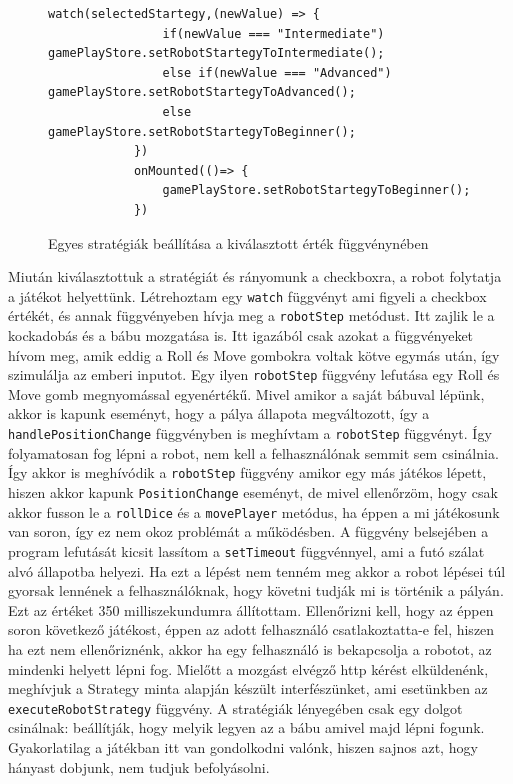 \documentclass[a4paper,twoside]{article}
\begin{document}
\begin{figure}
	\caption{Egyes stratégiák beállítása a kiválasztott érték függvénynében}
	\begin{minipage}{\textwidth}
		\begin{lstlisting}[style=javascriptStyle]
			watch(selectedStartegy,(newValue) => {
				if(newValue === "Intermediate") gamePlayStore.setRobotStartegyToIntermediate();
				else if(newValue === "Advanced") gamePlayStore.setRobotStartegyToAdvanced();
				else gamePlayStore.setRobotStartegyToBeginner();
			})
			onMounted(()=> {
				gamePlayStore.setRobotStartegyToBeginner();
			})
		\end{lstlisting}
	\end{minipage}
	
	\label{setStrat}
\end{figure}
\FloatBarrier
Miután kiválasztottuk a stratégiát és rányomunk a checkboxra, a robot folytatja a játékot helyettünk. Létrehoztam egy \verb|watch| függvényt ami figyeli a checkbox értékét, és annak függvényeben hívja meg a \verb|robotStep| metódust. Itt zajlik le a kockadobás és a bábu mozgatása is. Itt igazából csak azokat a függvényeket hívom meg, amik eddig a Roll és Move gombokra voltak kötve egymás után, így szimulálja az emberi inputot. Egy ilyen \verb|robotStep| függvény lefutása egy Roll és Move gomb megnyomással egyenértékű. Mivel amikor a saját bábuval lépünk, akkor is kapunk eseményt, hogy a pálya állapota megváltozott, így a \verb|handlePositionChange| függvényben is meghívtam a \verb|robotStep| függvényt. Így folyamatosan fog lépni a robot, nem kell a felhasználónak semmit sem csinálnia. Így akkor is meghívódik a \verb|robotStep| függvény amikor egy más játékos lépett, hiszen akkor kapunk \verb|PositionChange| eseményt, de mivel ellenőrzöm, hogy csak akkor fusson le a \verb|rollDice| és a \verb|movePlayer| metódus, ha éppen a mi játékosunk van soron, így ez nem okoz problémát a működésben. A függvény belsejében a program lefutását kicsit lassítom a \verb|setTimeout| függvénnyel, ami a futó szálat alvó állapotba helyezi. Ha ezt a lépést nem tenném meg akkor a robot lépései túl gyorsak lennének a felhasználóknak, hogy követni tudják mi is történik a pályán. Ezt az értéket 350  milliszekundumra állítottam. Ellenőrizni kell, hogy az éppen soron következő játékost, éppen az adott felhasználó csatlakoztatta-e fel, hiszen ha ezt nem ellenőriznénk, akkor ha egy felhasználó is bekapcsolja a robotot, az mindenki helyett lépni fog. Mielőtt a mozgást elvégző http kérést elküldenénk, meghívjuk a Strategy minta alapján készült interfészünket, ami esetünkben az \verb|executeRobotStrategy| függvény. A stratégiák lényegében csak egy dolgot csinálnak: beállítják, hogy melyik legyen az a bábu amivel majd lépni fogunk. Gyakorlatilag a játékban itt van gondolkodni valónk, hiszen sajnos azt, hogy hányast dobjunk, nem tudjuk befolyásolni. 
\end{document}
